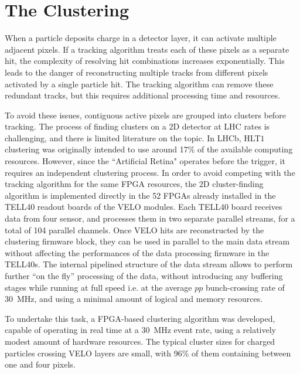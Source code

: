 \section{The Clustering}



When a particle deposits charge in a detector layer, it can activate multiple adjacent pixels. If a tracking algorithm treats each of these pixels as a separate hit, the complexity of resolving hit combinations increases exponentially. This leads to the danger of reconstructing multiple tracks from different pixels activated by a single particle hit. The tracking algorithm can remove these redundant tracks, but this requires additional processing time and resources.

To avoid these issues, contiguous active pixels are grouped into clusters before tracking. The process of finding clusters on a $2$D detector at LHC rates is challenging, and there is limited literature on the topic. In LHCb, HLT$1$ clustering was originally intended to use around 17\% of the available computing resources. However, since the ``Artificial Retina" operates before the trigger, it requires an independent clustering process. In order to avoid competing with the tracking algorithm for the same FPGA resources, the $2$D cluster-finding algorithm is implemented directly in the 52 FPGAs already installed in the TELL40 readout boards of the VELO modules. Each TELL40 board receives data from four sensor, and processes them in two separate parallel streams, for a total of 104 parallel channels. Once VELO hits are reconstructed by the clustering firmware block, they can be used in parallel to the main data stream without affecting the performances of the data processing firmware in the TELL40s. The internal pipelined structure of the data stream allows to perform further ``on the fly''  processing of the data, without introducing any buffering stages while running at full speed i.e. at the average $pp$ bunch-crossing rate of \SI{30}{\mega\hertz}, and using a minimal amount of logical and memory resources.%

To undertake this task, a FPGA-based clustering algorithm was developed, capable of operating in real time at a \SI{30}{\mega\hertz} event rate, using a relatively modest amount of hardware resources. The typical cluster sizes for charged particles crossing VELO layers are small, with 96\% of them containing between one and four pixels. 

